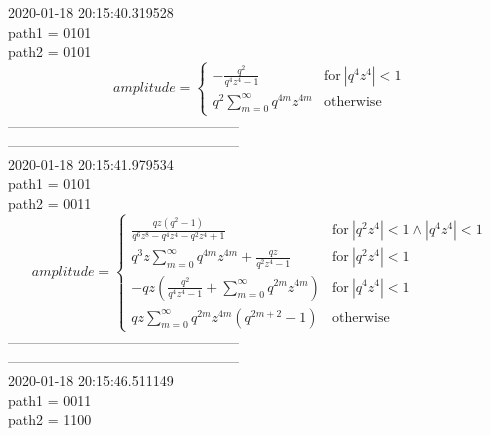 2020-01-18 20:15:40.319528\\
path1 = 0101\\
path2 = 0101\\
$$amplitude = \begin{cases} - \frac{q^{2}}{q^{4} z^{4} - 1} & \text{for}\: \left|{q^{4} z^{4}}\right| < 1 \\q^{2} \sum_{m=0}^{\infty} q^{4 m} z^{4 m} & \text{otherwise} \end{cases}$$
--------------------------------------------------\\
--------------------------------------------------\\
2020-01-18 20:15:41.979534\\
path1 = 0101\\
path2 = 0011\\
$$amplitude = \begin{cases} \frac{q z \left(q^{2} - 1\right)}{q^{6} z^{8} - q^{4} z^{4} - q^{2} z^{4} + 1} & \text{for}\: \left|{q^{2} z^{4}}\right| < 1 \wedge \left|{q^{4} z^{4}}\right| < 1 \\q^{3} z \sum_{m=0}^{\infty} q^{4 m} z^{4 m} + \frac{q z}{q^{2} z^{4} - 1} & \text{for}\: \left|{q^{2} z^{4}}\right| < 1 \\- q z \left(\frac{q^{2}}{q^{4} z^{4} - 1} + \sum_{m=0}^{\infty} q^{2 m} z^{4 m}\right) & \text{for}\: \left|{q^{4} z^{4}}\right| < 1 \\q z \sum_{m=0}^{\infty} q^{2 m} z^{4 m} \left(q^{2 m + 2} - 1\right) & \text{otherwise} \end{cases}$$
--------------------------------------------------\\
--------------------------------------------------\\
2020-01-18 20:15:46.511149\\
path1 = 0011\\
path2 = 1100\\
